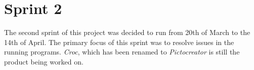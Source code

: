 \chapter{Sprint 2}
The second sprint of this project was decided to run from 20th of March to the 14th of April.
The primary focus of this sprint was to resolve issues in the running programs.
\textit{Croc}, which has been renamed to \textit{Pictocreator} is still the product being worked on.




